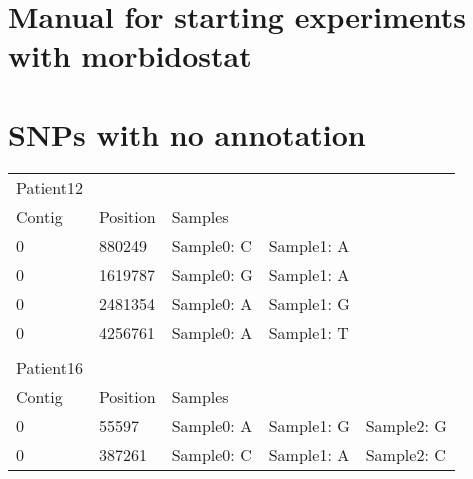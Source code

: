 \section{Manual for starting experiments with morbidostat}
\label{section:manual}





\section{SNPs with no annotation}
\label{section:snps_with_no_annotation}
\begin{longtable}{|l|l|l|l|l|}
	\cline{1-4}
	\multicolumn{1}{|l}{Patient12} & \multicolumn{1}{l}{} & \multicolumn{1}{l}{}        &                      & \multicolumn{1}{l}{}  \\ 
	\cline{1-4}
	Contig                         & Position             & \multicolumn{1}{l}{Samples} &                      & \multicolumn{1}{l}{}  \\ 
	\cline{1-4}
	0                              & 880249               & Sample0: C                  & Sample1: A           & \multicolumn{1}{l}{}  \\ 
	\cline{1-4}
	0                              & 1619787              & Sample0: G                  & Sample1: A           & \multicolumn{1}{l}{}  \\ 
	\cline{1-4}
	0                              & 2481354              & Sample0: A                  & Sample1: G           & \multicolumn{1}{l}{}  \\ 
	\cline{1-4}
	0                              & 4256761              & Sample0: A                  & Sample1: T           & \multicolumn{1}{l}{}  \\ 
	\cline{1-4}
	\multicolumn{1}{l}{}           & \multicolumn{1}{l}{} & \multicolumn{1}{l}{}        & \multicolumn{1}{l}{} & \multicolumn{1}{l}{}  \\ 
	\hline
	\multicolumn{1}{|l}{Patient16} & \multicolumn{1}{l}{} & \multicolumn{1}{l}{}        & \multicolumn{1}{l}{} &                       \\ 
	\hline
	Contig                         & Position             & \multicolumn{1}{l}{Samples} & \multicolumn{1}{l}{} &                       \\ 
	\hline
	0                              & 55597                & Sample0: A                  & Sample1: G           & Sample2: G            \\ 
	\hline
	0                              & 387261               & Sample0: C                  & Sample1: A           & Sample2: C            \\ 

\end{longtable}
